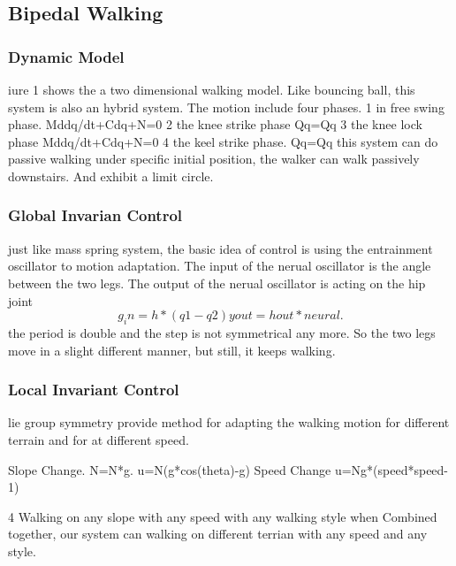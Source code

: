 \subsection{Bipedal Walking}
\subsubsection{Dynamic Model}
iure 1 shows the a two dimensional walking model.
Like bouncing ball, this system is also an hybrid system.
The motion include four phases.
1 in free swing phase.
Mddq/dt+Cdq+N=0
2 the knee strike phase
Qq=Qq
3 the knee lock phase
Mddq/dt+Cdq+N=0
4 the keel strike phase.
Qq=Qq
this system can do passive walking
under specific initial position, the walker can walk passively downstairs.
And exhibit a limit circle.

\subsubsection{Global Invarian Control}
just like mass spring system, the basic idea of control is using the entrainment oscillator to 
motion adaptation. 
The input of the nerual oscillator is the angle between the two legs.
The output of the nerual oscillator is acting on the hip joint
\[
g_in=h*(q1-q2)
yout=hout*neural.
\]
the period is double and the step is not symmetrical any more. So the two legs move in a slight different manner, but still, it keeps walking.

\subsubsection{Local Invariant Control}
lie group symmetry provide method for adapting the walking motion for different terrain and for at different speed.


Slope Change.
N=N*g.
u=N(g*cos(theta)-g)
Speed Change
u=Ng*(speed*speed-1)

4 Walking on any slope with any speed with any walking style
when Combined together, our system can walking on different terrian with any speed and any style.
